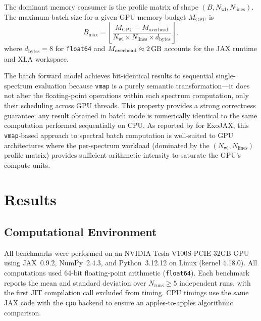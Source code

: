 \documentclass[preprint,12pt,authoryear]{elsarticle}
\begin{document}
The dominant memory consumer is the profile matrix of shape $(B, N_\mathrm{wl}, N_\mathrm{lines})$.
The maximum batch size for a given GPU memory budget $M_\mathrm{GPU}$ is
\begin{equation}
  B_\mathrm{max} = \left\lfloor \frac{M_\mathrm{GPU} - M_\mathrm{overhead}}{N_\mathrm{wl} \times N_\mathrm{lines} \times d_\mathrm{bytes}} \right\rfloor,
  \label{eq:bmax}
\end{equation}
where $d_\mathrm{bytes} = 8$ for \texttt{float64} and $M_\mathrm{overhead} \approx \SI{2}{\giga\byte}$ accounts for the JAX runtime and XLA workspace.

The batch forward model achieves bit-identical results to sequential single-spectrum evaluation because \texttt{vmap} is a purely semantic transformation---it does not alter the floating-point operations within each spectrum computation, only their scheduling across GPU threads.
This property provides a strong correctness guarantee: any result obtained in batch mode is numerically identical to the same computation performed sequentially on CPU.
As reported by \citet{Kawahara2022} for ExoJAX, this \texttt{vmap}-based approach to spectral batch computation is well-suited to GPU architectures where the per-spectrum workload (dominated by the $(N_\mathrm{wl}, N_\mathrm{lines})$ profile matrix) provides sufficient arithmetic intensity to saturate the GPU's compute units.

\section{Results}
\label{sec:results}

\subsection{Computational Environment}
\label{sec:environment}

All benchmarks were performed on an NVIDIA Tesla V100S-PCIE-32GB GPU using JAX~0.9.2, NumPy~2.4.3, and Python~3.12.12 on Linux (kernel 4.18.0).
All computations used 64-bit floating-point arithmetic (\texttt{float64}).
Each benchmark reports the mean and standard deviation over $N_\mathrm{runs} \geq 5$ independent runs, with the first JIT compilation call excluded from timing.
CPU timings use the same JAX code with the \texttt{cpu} backend to ensure an apples-to-apples algorithmic comparison.
\end{document}
